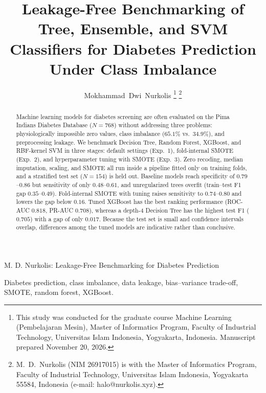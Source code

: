 \documentclass[journal]{IEEEtran}
\begin{document}
\title{Leakage-Free Benchmarking of Tree, Ensemble, and SVM Classifiers for Diabetes Prediction Under Class Imbalance}

\author{Mokhammad~Dwi~Nurkolis%
\thanks{This study was conducted for the graduate course Machine Learning (Pembelajaran Mesin), Master of Informatics Program, Faculty of Industrial Technology, Universitas Islam Indonesia, Yogyakarta, Indonesia. Manuscript prepared November 20, 2026.}%
\thanks{M.~D.~Nurkolis (NIM 26917015) is with the Master of Informatics Program, Faculty of Industrial Technology, Universitas Islam Indonesia, Yogyakarta 55584, Indonesia (e-mail: halo@nurkolis.xyz).}}

%
{M. D. Nurkolis: Leakage-Free Benchmarking for Diabetes Prediction}

\maketitle

\begin{abstract}
Machine learning models for diabetes screening are often evaluated on the Pima Indians Diabetes Database ($N = 768$) without addressing three problems: physiologically impossible zero values, class imbalance ($65.1\%$ vs.\ $34.9\%$), and preprocessing leakage. We benchmark Decision Tree, Random Forest, XGBoost, and RBF-kernel SVM in three stages: default settings (Exp.~1), fold-internal SMOTE (Exp.~2), and hyperparameter tuning with SMOTE (Exp.~3). Zero recoding, median imputation, scaling, and SMOTE all run inside a pipeline fitted only on training folds, and a stratified test set ($N = 154$) is held out. Baseline models reach specificity of $0.79$--$0.86$ but sensitivity of only $0.48$--$0.61$, and unregularized trees overfit (train--test F1 gap $0.35$--$0.49$). Fold-internal SMOTE with tuning raises sensitivity to $0.74$--$0.80$ and lowers the gap below $0.16$. Tuned XGBoost has the best ranking performance (ROC-AUC $0.818$, PR-AUC $0.708$), whereas a depth-4 Decision Tree has the highest test F1 ($0.705$) with a gap of only $0.017$. Because the test set is small and confidence intervals overlap, differences among the tuned models are indicative rather than conclusive.
\end{abstract}

\begin{IEEEkeywords}
Diabetes prediction, class imbalance, data leakage, bias--variance trade-off, SMOTE, random forest, XGBoost.
\end{IEEEkeywords}
\end{document}
